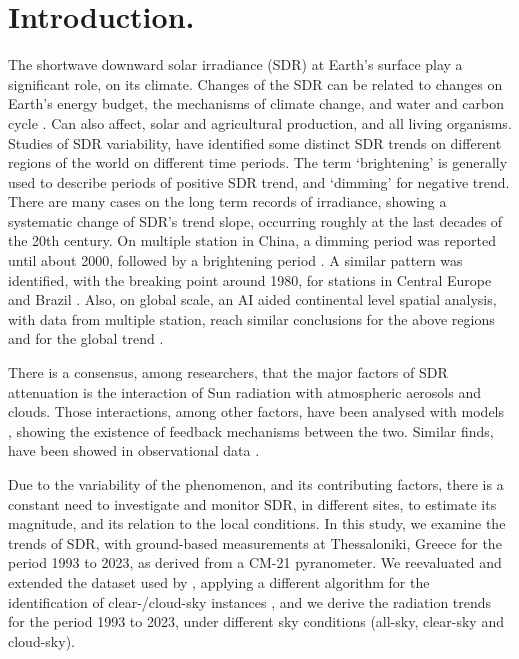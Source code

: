 \documentclass[applsci,article,submit,moreauthors,pdftex]{Definitions/mdpi}
\begin{document}

\hypertarget{introduction.}{%
\section{Introduction.}\label{introduction.}}

The shortwave downward solar irradiance (SDR) at Earth's surface play a
significant role, on its climate. Changes of the SDR can be related to
changes on Earth's energy budget, the mechanisms of climate change, and
water and carbon cycle \citep{Wild2009}. Can also affect, solar and
agricultural production, and all living organisms. Studies of SDR
variability, have identified some distinct SDR trends on different
regions of the world on different time periods. The term `brightening'
is generally used to describe periods of positive SDR trend, and
`dimming' for negative trend. There are many cases on the long term
records of irradiance, showing a systematic change of SDR's trend slope,
occurring roughly at the last decades of the 20th century. On multiple
station in China, a dimming period was reported until about 2000,
followed by a brightening period \citep{Yang2021}. A similar pattern was
identified, with the breaking point around 1980, for stations in Central
Europe \citep{Wild2021} and Brazil \citep{Yamasoe2021}. Also, on global
scale, an AI aided continental level spatial analysis, with data from
multiple station, reach similar conclusions for the above regions and
for the global trend \citep{Yuan2021}.

There is a consensus, among researchers, that the major factors of SDR
attenuation is the interaction of Sun radiation with atmospheric
aerosols and clouds. Those interactions, among other factors, have been
analysed with models \citep{Li2016, Samset2018}, showing the existence
of feedback mechanisms between the two. Similar finds, have been showed
in observational data \citep[ and references
therein]{Schwarz2020, Ohvril2009, Zerefos2009, Xia2007}.

Due to the variability of the phenomenon, and its contributing factors,
there is a constant need to investigate and monitor SDR, in different
sites, to estimate its magnitude, and its relation to the local
conditions. In this study, we examine the trends of SDR, with
ground-based measurements at Thessaloniki, Greece for the period 1993 to
2023, as derived from a CM-21 pyranometer. We reevaluated and extended
the dataset used by \citet{Bais2013}, applying a different algorithm for
the identification of clear-/cloud-sky instances
\citep{Reno2016, Reno2012a}, and we derive the radiation trends for the
period 1993 to 2023, under different sky conditions (all-sky, clear-sky
and cloud-sky).
\end{document}
